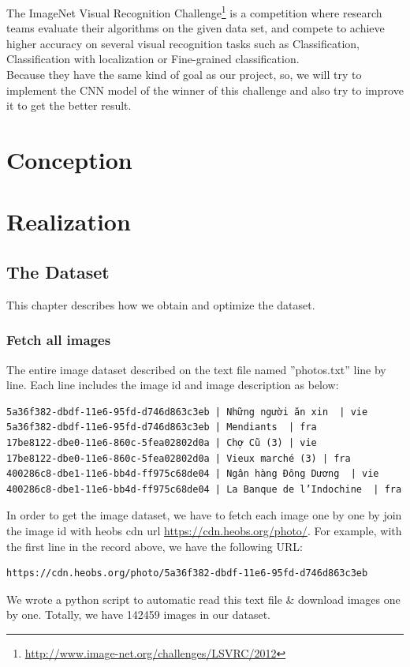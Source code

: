\documentclass[hidelinks,12pt,a4paper]{report}
\begin{document}
The ImageNet Visual Recognition Challenge\footnote{\url{http://www.image-net.org/challenges/LSVRC/2012}} is a competition where research teams evaluate their algorithms on the given data set, and compete to achieve higher accuracy on several visual recognition tasks such as Classification, Classification with localization or Fine-grained classification. \\
Because they have the same kind of goal as our project, so, we will try to implement the CNN model of the winner of this challenge and also try to improve it to get the better result.

\chapter{Conception}

\chapter{Realization}
\section{The Dataset}
This chapter describes how we obtain and optimize the dataset.
\subsection{Fetch all images}
The entire image dataset described on the text file named ”photos.txt” line by line. Each line includes the image id and image description as below:
\begin{verbatim}
5a36f382-dbdf-11e6-95fd-d746d863c3eb | Những người ăn xin  | vie
5a36f382-dbdf-11e6-95fd-d746d863c3eb | Mendiants  | fra
17be8122-dbe0-11e6-860c-5fea02802d0a | Chợ Cũ (3) | vie
17be8122-dbe0-11e6-860c-5fea02802d0a | Vieux marché (3) | fra
400286c8-dbe1-11e6-bb4d-ff975c68de04 | Ngân hàng Đông Dương  | vie
400286c8-dbe1-11e6-bb4d-ff975c68de04 | La Banque de l’Indochine  | fra
\end{verbatim}
In order to get the image dataset, we have to fetch each image one by one by join the image id with heobs cdn url \href{https://cdn.heobs.org/photo/}{https://cdn.heobs.org/photo/}. For example, with the first line in the record above, we have the following URL: 
\begin{verbatim}
https://cdn.heobs.org/photo/5a36f382-dbdf-11e6-95fd-d746d863c3eb
\end{verbatim}
We wrote a python script to automatic read this text file \& download images one by one.
Totally, we have 142459 images in our dataset.
\end{document}
